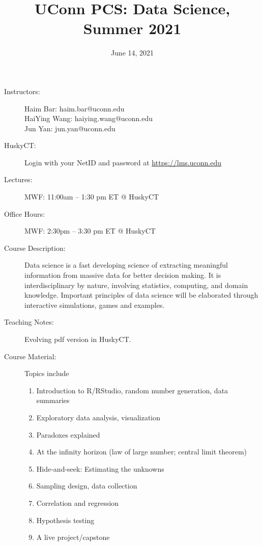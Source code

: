 \documentclass[twocolumn]{article}
\begin{document}
\title{UConn PCS: Data Science, Summer 2021}
\date{June 14, 2021}
\maketitle

\thispagestyle{fancy}


\begin{description}
\item[Instructors:] \hspace{0pt}

  Haim Bar: haim.bar@uconn.edu\\
  HaiYing Wang: haiying.wang@uconn.edu\\
  Jun Yan: jun.yan@uconn.edu

\item[HuskyCT:] Login with your NetID and password at
  \url{https://lms.uconn.edu}
  
\item[Lectures:] 
  MWF: 11:00am -- 1:30 pm ET @ HuskyCT

\item[Office Hours:]
  MWF: 2:30pm -- 3:30 pm ET @ HuskyCT


\item[Course Description:]
Data science is a fast developing science of extracting meaningful
information from massive data for better decision making. It is
interdisciplinary by nature, involving statistics, computing, and
domain knowledge. Important principles of data science will be
elaborated through interactive simulations, games and examples.


\item[Teaching Notes:] 
  Evolving pdf version in HuskyCT.
  
\item[Course Material:]

Topics include
\begin{enumerate}[noitemsep]
\item
  Introduction to R/RStudio, random number generation, data summaries
\item
  Exploratory data analysis, visualization
\item
  Paradoxes explained
\item
  At the infinity horizon (law of large number; central limit theorem)
\item
  Hide-and-seek: Estimating the unknowns
\item
  Sampling design, data collection
\item
  Correlation and regression
\item
  Hypothesis testing
\item
  A live project/capstone
\end{enumerate}


\end{description}
\end{document}
